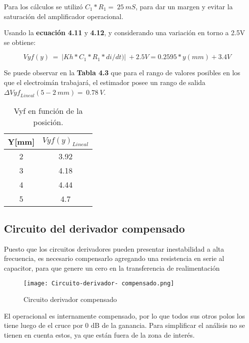 \noindent Para los c\'{a}lculos se utiliz\'{o} $C_1*R_1=\ 25\ mS$, para dar un margen y evitar la saturaci\'{o}n del amplificador operacional.  

\noindent Usando la \textbf{ecuaci\'{o}n 4.11 }y \textbf{4.12}, y considerando una variaci\'{o}n en torno a 2.5V se obtiene:

\noindent

\begin{equation} \label{eq_Vyf-lineal}
	Vyf(y)\ =\ |Kh*C_1*R_1*di/dt)|\ +2.5V=0.2595*y(mm)+3.4V
\end{equation}

\noindent Se puede observar en la \textbf{Tabla 4.3} que para el rango de valores posibles en los que el electroim\'{a}n trabajar\'{a}, el estimador posee un rango de salida ${\mathit{\Delta}{Vyf}_{Lineal}}(5-2\ mm)=\ 0.78\ V$.

\begin{table}[H]
	\begin{center}
		\begin{tabular}{| c | c |}
			\hline
			Y[mm] & ${Vyf(y)}_{Lineal}$\\ \hline
			2 & 3.92 \\ \hline 
			3 & 4.18 \\ \hline 
			4 & 4.44 \\ \hline 
			5 & 4.7 \\ \hline 
		\end{tabular}
		\caption{Vyf en función de la posición.}
		\label{tab_Vyf_vs_y}
	\end{center}
\end{table}

\subsection{Circuito del derivador compensado}

\noindent Puesto que los circuitos derivadores pueden presentar inestabilidad a alta frecuencia, es necesario compensarlo agregando una resistencia en serie al capacitor, para que genere un cero en la transferencia de realimentaci\'{o}n

\begin{figure}[H]
	\centering
	\texttt{[image: Circuito-derivador- compensado.png]}
	\caption{Circuito derivador compensado}
	\label{fig:img_Circuito_derivador_compensado}
\end{figure}

\noindent El operacional es internamente compensado, por lo que todos sus otros polos los tiene luego de el cruce por 0 dB de la ganancia. Para simplificar el an\'{a}lisis no se tienen en cuenta estos, ya que est\'{a}n fuera de la zona de inter\'{e}s.

